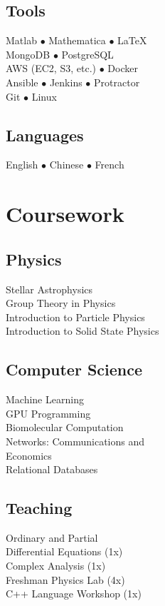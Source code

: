 \documentclass[]{yubo-resume-openfont}
\begin{document}
\begin{minipage}[t]{0.33\textwidth}
    \subsection{Tools}
    Matlab $\bullet$ Mathematica $\bullet$ \LaTeX\\
    MongoDB $\bullet$ PostgreSQL \\
    AWS (EC2, S3, etc.) $\bullet$ Docker\\
    Ansible $\bullet$ Jenkins $\bullet$ Protractor\\
    Git $\bullet$ Linux\\
    \sectionsep
    \subsection{Languages}
    English $\bullet$ Chinese $\bullet$ French
    \sectionsep




\section{Coursework}
    \subsection{Physics}
        Stellar Astrophysics\\
        Group Theory in Physics\\
        Introduction to Particle Physics\\
        Introduction to Solid State Physics\\
    \sectionsep

    \subsection{Computer Science}
        Machine Learning\\
        GPU Programming\\
        Biomolecular Computation\\
        Networks: Communications and\\
            \tab Economics\\
        Relational Databases
    \sectionsep

    \subsection{Teaching}
        Ordinary and Partial\\
            \tab Differential Equations (1x)\\
        Complex Analysis (1x)\\
        Freshman Physics Lab (4x)\\
        C++ Language Workshop (1x)
    \sectionsep


\end{minipage}
\end{document}
